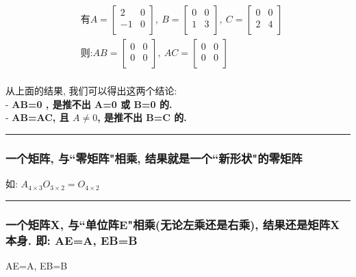 \documentclass[UTF8]{ctexart}
\begin{document}
\begin{align*}
	& \text{有}	A=\left[ \begin{matrix}
		2&		0\\
		-1&		0\\
	\end{matrix} \right] ,\ B=\left[ \begin{matrix}
		0&		0\\
		1&		3\\
	\end{matrix} \right] ,\ C=\left[ \begin{matrix}
		0&		0\\
		2&		4\\
	\end{matrix} \right]\\
	&  \text{则:} AB=\left[ \begin{matrix}
		0&		0\\
		0&		0\\
	\end{matrix} \right] ,\ AC=\left[ \begin{matrix}
		0&		0\\
		0&		0\\
	\end{matrix} \right]\\
\end{align*}

从上面的结果, 我们可以得出这两个结论: \\
- \textbf{AB=0 , 是推不出 A=0 或 B=0 的.} \\
- \textbf{AB=AC, 且 $A \neq 0 $, 是推不出 B=C 的.} \\

\hrule

\subsubsection{一个矩阵, 与``零矩阵"相乘, 结果就是一个``新形状"的零矩阵}

如: $A_{4×3}O_{3×2}=O_{4×2}$ \\

\hrule

\subsubsection{一个矩阵X, 与``单位阵E"相乘(无论左乘还是右乘), 结果还是矩阵X本身. 即: AE=A, EB=B}

AE=A, EB=B \\
\end{document}

